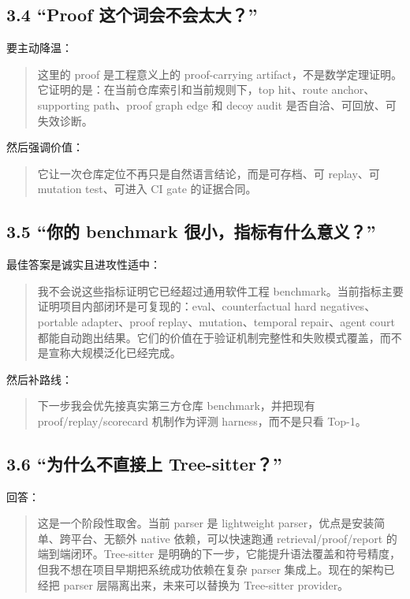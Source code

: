 \documentclass[UTF8,12pt,openany]{ctexbook}
\begin{document}
\subsection{3.4 “Proof 这个词会不会太大？”}

要主动降温：\par

\begin{quote}
这里的 proof 是工程意义上的 proof-carrying artifact，不是数学定理证明。它证明的是：在当前仓库索引和当前规则下，top hit、route anchor、supporting path、proof graph edge 和 decoy audit 是否自洽、可回放、可失效诊断。
\end{quote}

然后强调价值：\par

\begin{quote}
它让一次仓库定位不再只是自然语言结论，而是可存档、可 replay、可 mutation test、可进入 CI gate 的证据合同。
\end{quote}

\subsection{3.5 “你的 benchmark 很小，指标有什么意义？”}

最佳答案是诚实且进攻性适中：\par

\begin{quote}
我不会说这些指标证明它已经超过通用软件工程 benchmark。当前指标主要证明项目内部闭环是可复现的：eval、counterfactual hard negatives、portable adapter、proof replay、mutation、temporal repair、agent court 都能自动跑出结果。它们的价值在于验证机制完整性和失败模式覆盖，而不是宣称大规模泛化已经完成。
\end{quote}

然后补路线：\par

\begin{quote}
下一步我会优先接真实第三方仓库 benchmark，并把现有 proof/replay/scorecard 机制作为评测 harness，而不是只看 Top-1。
\end{quote}

\subsection{3.6 “为什么不直接上 Tree-sitter？”}

回答：\par

\begin{quote}
这是一个阶段性取舍。当前 parser 是 lightweight parser，优点是安装简单、跨平台、无额外 native 依赖，可以快速跑通 retrieval/proof/report 的端到端闭环。Tree-sitter 是明确的下一步，它能提升语法覆盖和符号精度，但我不想在项目早期把系统成功依赖在复杂 parser 集成上。现在的架构已经把 parser 层隔离出来，未来可以替换为 Tree-sitter provider。
\end{quote}
\end{document}
